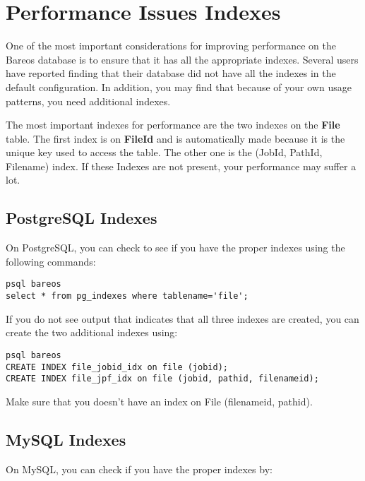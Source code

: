 \section{Performance Issues Indexes}


One of the most important considerations for improving performance on
the Bareos database is to ensure that it has all the appropriate indexes.
Several users have reported finding that their database did not have
all the indexes in the default configuration.  In addition, you may
find that because of your own usage patterns, you need additional indexes.

The most important indexes for performance are the two indexes on the
{\bf File} table.  The first index is on {\bf FileId} and is automatically
made because it is the unique key used to access the table.  The other
one is the (JobId, PathId, Filename) index.  If these Indexes
are not present, your performance may suffer a lot.

\subsection{PostgreSQL Indexes}
On PostgreSQL, you can check to see if you have the proper indexes using
the following commands:

\footnotesize
\begin{verbatim}
psql bareos
select * from pg_indexes where tablename='file';
\end{verbatim}
\normalsize

If you do not see output that indicates that all three indexes
are created, you can create the two additional indexes using:

\footnotesize
\begin{verbatim}
psql bareos
CREATE INDEX file_jobid_idx on file (jobid);
CREATE INDEX file_jpf_idx on file (jobid, pathid, filenameid);
\end{verbatim}
\normalsize

Make sure that you doesn't have an index on File (filenameid, pathid).

\subsection{MySQL Indexes}
On MySQL, you can check if you have the proper indexes by:

